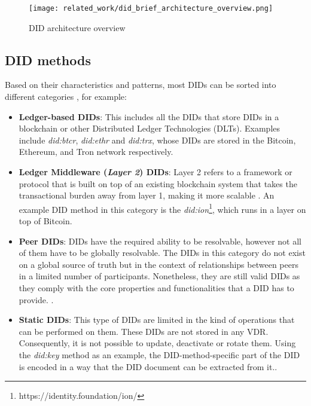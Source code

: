 \begin{figure}[H]
  \centering
  \texttt{[image: related\_work/did\_brief\_architecture\_overview.png]}
  \caption{DID architecture overview \cite{sporny_longley_sabadello_reed_steele_2021}}
  \label{fig:did_architecture}
\end{figure}

\subsection{DID methods}\label{subsec:did_methods}

 Based on their characteristics and patterns, most DIDs can be sorted into different categories \cite{preukschat_reed_2021}, for example: 

\begin{itemize}
  \item \textbf{Ledger-based DIDs}: This includes all the DIDs that store DIDs in a blockchain or other Distributed Ledger Technologies (DLTs). Examples include \emph{did:btcr}, \emph{did:ethr} and \emph{did:trx}, whose DIDs are stored in the Bitcoin, Ethereum, and Tron network respectively.
  \item \textbf{Ledger Middleware (\emph{Layer 2}) DIDs}: Layer 2 refers to a framework or protocol that is built on top of an existing blockchain system that takes the transactional burden away from layer 1, making it more scalable \cite{weston_2022}. An example DID method in this category is the \emph{did:ion}\footnote{https://identity.foundation/ion/}, which runs in a layer on top of Bitcoin. 
  \item \textbf{Peer DIDs}: DIDs have the required ability to be resolvable, however not all of them have to be globally resolvable. The DIDs in this category do not exist on a global source of truth but in the context of relationships between peers in a limited number of participants. Nonetheless, they are still valid DIDs as they comply with the core properties and functionalities that a DID has to provide. \cite{preukschat_reed_2021}.
  \item \textbf{Static DIDs}: This type of DIDs are limited in the kind of operations that can be performed on them. These DIDs are not stored in any VDR. Consequently, it is not possible to update, deactivate or rotate them. Using the \emph{did:key} method as an example, the DID-method-specific part of the DID is encoded in a way that the DID document can be extracted from it.\cite{longley_zagidulin_sporny_2022}.
\end{itemize}

